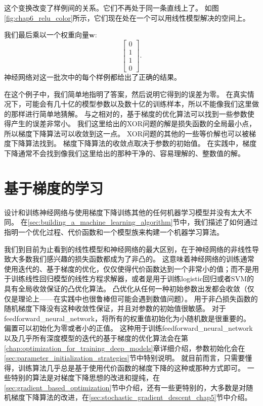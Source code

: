 
这个变换改变了样例间的关系。它们不再处于同一条直线上了。
如图\ref{fig:chap6_relu_color}所示，它们现在处在一个可以用线性模型解决的空间上。

我们最后乘以一个权重向量$\bm{w}$:
\begin{equation}
\begin{bmatrix}
0\\
1\\
1\\
0
\end{bmatrix}.
\end{equation}
神经网络对这一批次中的每个样例都给出了正确的结果。

在这个例子中，我们简单地指明了答案，然后说明它得到的误差为零。
在真实情况下，可能会有几十亿的模型参数以及数十亿的训练样本，所以不能像我们这里做的那样进行简单地猜解。
与之相对的，基于梯度的优化算法可以找到一些参数使得产生的误差非常小。
我们这里给出的XOR问题的解是损失函数的全局最小点，所以梯度下降算法可以收敛到这一点。
XOR问题的其他的一些等价解也可以被梯度下降算法找到。
梯度下降算法的收敛点取决于参数的初始值。
在实践中，梯度下降通常不会找到像我们这里给出的那种干净的、容易理解的、整数值的解。

\section{基于梯度的学习}
\label{sec:gradient_based_learning}

设计和训练神经网络与使用梯度下降训练其他的任何机器学习模型并没有太大不同。
在\ref{sec:building_a_machine_learning_algorithm}节中，我们描述了如何通过指明一个优化过程、代价函数和一个模型族来构建一个机器学习算法。

我们到目前为止看到的线性模型和神经网络的最大区别，在于神经网络的非线性导致大多数我们感兴趣的损失函数都成为了非凸的。
这意味着神经网络的训练通常使用迭代的、基于梯度的优化，仅仅使得代价函数达到一个非常小的值；而不是用于训练线性回归模型的线性方程求解器，或者是用于训练logistic回归或者SVM的具有全局收敛保证的凸优化算法。
凸优化从任何一种初始参数出发都会收敛（仅仅是理论上——在实践中也很鲁棒但可能会遇到数值问题）。
用于非凸损失函数的随机梯度下降没有这种收敛性保证，并且对参数的初始值很敏感。
对于\gls{feedforward_neural_network}，将所有的权重值初始化为小随机数是很重要的。
偏置可以初始化为零或者小的正值。
这种用于训练\gls{feedforward_neural_network}以及几乎所有深度模型的迭代的基于梯度的优化算法会在第\ref{chap:optimization_for_training_deep_models}章详细介绍，参数初始化会在\ref{sec:parameter_initialization_strategies}节中特别说明。
就目前而言，只需要懂得，训练算法几乎总是基于使用代价函数的梯度下降的这种或那种方式即可。
一些特别的算法是对梯度下降思想的改进和提纯，在\ref{sec:gradient_based_optimization}节中介绍，还有一些更特别的，大多数是对随机梯度下降算法的改进，在\ref{sec:stochastic_gradient_descent_chap5}节中介绍。

